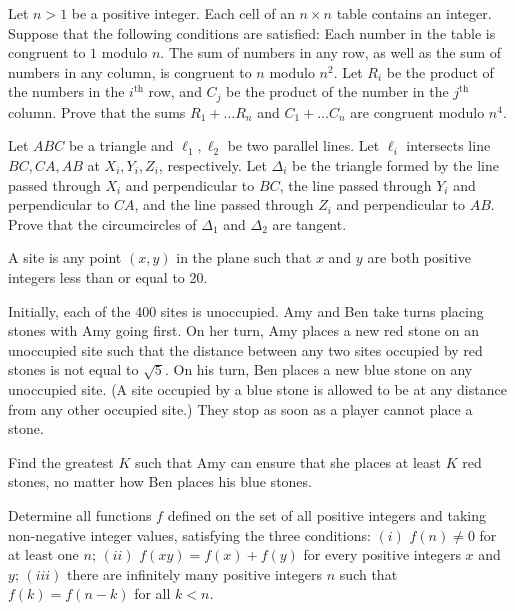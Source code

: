 \documentclass[11pt]{scrartcl}
\begin{document}
\begin{problem}[1248852037865425410]
Let $n>1$ be a positive integer. Each cell of an $n\times n$ table contains an integer. Suppose that the following conditions are satisfied:
Each number in the table is congruent to $1$ modulo $n$.
The sum of numbers in any row, as well as the sum of numbers in any column, is congruent to $n$ modulo $n^2$.
Let $R_i$ be the product of the numbers in the $i^{\text{th}}$ row, and $C_j$ be the product of the number in the $j^{\text{th}}$ column. Prove that the sums $R_1+\hdots R_n$ and $C_1+\hdots C_n$ are congruent modulo $n^4$.
\end{problem}
\begin{problem}[4992489807901310938]
Let $ABC$ be a triangle and $\ell_1,\ell_2$ be two parallel lines. Let $\ell_i$ intersects line $BC,CA,AB$ at $X_i,Y_i,Z_i$, respectively. Let $\Delta_i$ be the triangle formed by the line passed through $X_i$ and perpendicular to $BC$, the line passed through $Y_i$ and perpendicular to $CA$, and the line passed through $Z_i$ and perpendicular to $AB$. Prove that the circumcircles of $\Delta_1$ and $\Delta_2$ are tangent.
\end{problem}
\begin{problem}[6246999615324043054]
	A site is any point $(x, y)$ in the plane such that $x$ and $y$ are both positive integers less than or equal to 20.

Initially, each of the 400 sites is unoccupied. Amy and Ben take turns placing stones with Amy going first. On her turn, Amy places a new red stone on an unoccupied site such that the distance between any two sites occupied by red stones is not equal to $\sqrt{5}$. On his turn, Ben places a new blue stone on any unoccupied site. (A site occupied by a blue stone is allowed to be at any distance from any other occupied site.) They stop as soon as a player cannot place a stone.

Find the greatest $K$ such that Amy can ensure that she places at least $K$ red stones, no matter how Ben places his blue stones.
\end{problem}
\begin{problem}[6116877365036470315]
	Determine all functions $f$ defined on the set of all positive integers and taking non-negative integer values, satisfying the three conditions:
$(i)$ $f(n) \neq 0$ for at least one $n$;
$(ii)$ $f(x y)=f(x)+f(y)$ for every positive integers $x$ and $y$;
$(iii)$ there are infinitely many positive integers $n$ such that $f(k)=f(n-k)$ for all $k<n$.
\end{problem}
\end{document}
